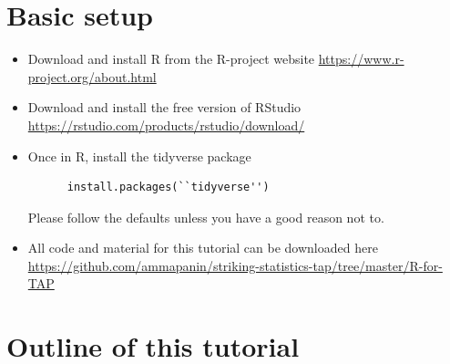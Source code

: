 \documentclass{article}
\begin{document}


\section{Basic setup}
\begin{itemize}
\item Download and install R from the R-project website
  \url{https://www.r-project.org/about.html}


  \item Download and install the free version of RStudio
    \url{https://rstudio.com/products/rstudio/download/}

  \item Once in R, install the tidyverse package

    \begin{lstlisting}
      install.packages(``tidyverse'')
  \end{lstlisting}
  
  Please follow the defaults unless you have a good reason not to.

  \item  All code and material for this tutorial can be downloaded here \url{https://github.com/ammapanin/striking-statistics-tap/tree/master/R-for-TAP}
\end{itemize}

\section{Outline of this tutorial}
\end{document}
